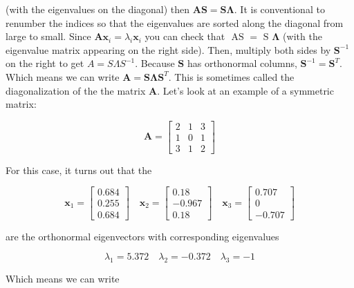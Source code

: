 \documentclass[main.tex]{subfiles}
\begin{document}
(with the eigenvalues on the diagonal) then $\mathbf{A S}=\mathbf{S} \boldsymbol{\Lambda}$. It is conventional to renumber the indices so that the eigenvalues are sorted along the diagonal from large to small. Since $\mathbf{A x}_{i}=\lambda_{i} \mathbf{x}_{i}$ you can check that $\text { AS }=\text { S } \boldsymbol{\Lambda}$ (with the eigenvalue matrix appearing on the right side). Then, multiply both sides by $\mathbf{S}^{-1}$ on the right to get $A=S \Lambda S^{-1}$. Because $\mathbf{S}$ has orthonormal columns, $\mathbf{S}^{-1}=\mathbf{S}^{T}$. Which means we can write $\mathbf{A}=\mathbf{S} \mathbf{\Lambda} \mathbf{S}^{T}$. This is sometimes called the diagonalization of the the matrix $\mathbf{A}$. Let's look at an example of a symmetric matrix:

$$
\mathbf{A}=\left[\begin{array}{lll}
2 & 1 & 3 \\
1 & 0 & 1 \\
3 & 1 & 2
\end{array}\right]
$$

For this case, it turns out that the

$$
\mathbf{x}_{1}=\left[\begin{array}{l}
0.684 \\
0.255 \\
0.684
\end{array}\right] \quad \mathbf{x}_{2}=\left[\begin{array}{c}
0.18 \\
-0.967 \\
0.18
\end{array}\right] \quad \mathbf{x}_{3}=\left[\begin{array}{c}
0.707 \\
0 \\
-0.707
\end{array}\right]
$$

are the orthonormal eigenvectors with corresponding eigenvalues

$$
\lambda_{1}=5.372 \quad \lambda_{2}=-0.372 \quad \lambda_{3}=-1
$$

Which means we can write
\end{document}
